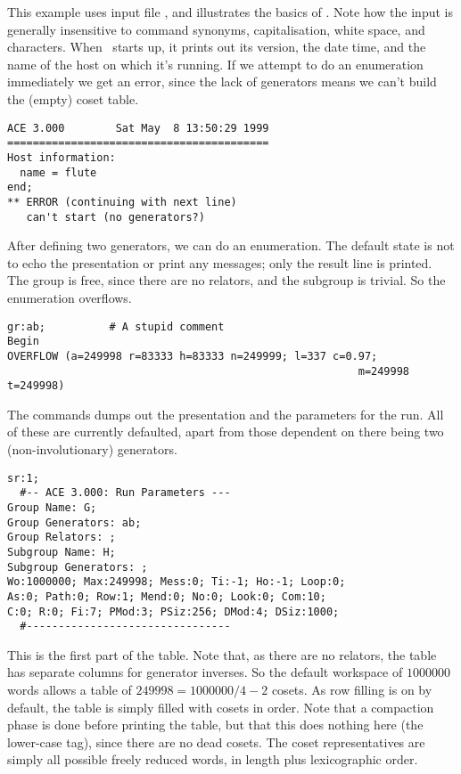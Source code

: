 
This example uses input file , and illustrates the basics of
  \ace.
Note how the input is generally insensitive to command synonyms,
  capitalisation, white space, and \ttt{:} \amp \ttt{;} characters.
%
When \ace\ starts up, it prints out its version, the date \amp time, and
  the name of the host on which it's running.
If we attempt to do an enumeration immediately we get an error, since the
  lack of generators means we can't build the (empty) coset table.

\bv\begin{verbatim}
ACE 3.000        Sat May  8 13:50:29 1999
=========================================
Host information:
  name = flute
end;
** ERROR (continuing with next line)
   can't start (no generators?)
\end{verbatim}\ev

After defining two generators, we can do an enumeration.
The default state is not to echo the presentation or print any messages;
  only the result line is printed.
The group is free, since there are no relators, and the subgroup is
 trivial.
So the enumeration overflows.

\bv\begin{verbatim}
gr:ab;          # A stupid comment
Begin
OVERFLOW (a=249998 r=83333 h=83333 n=249999; l=337 c=0.97; 
                                                       m=249998 t=249998)
\end{verbatim}\ev

The  commands dumps out the presentation and the parameters for
  the run.
All of these are currently defaulted, apart from those dependent on there
  being two (non-involutionary) generators.

\bv\begin{verbatim}
sr:1;
  #-- ACE 3.000: Run Parameters ---
Group Name: G;
Group Generators: ab;
Group Relators: ;
Subgroup Name: H;
Subgroup Generators: ;
Wo:1000000; Max:249998; Mess:0; Ti:-1; Ho:-1; Loop:0;
As:0; Path:0; Row:1; Mend:0; No:0; Look:0; Com:10;
C:0; R:0; Fi:7; PMod:3; PSiz:256; DMod:4; DSiz:1000;
  #--------------------------------
\end{verbatim}\ev

This is the first part of the table.
Note that, as there are no relators, the table has separate columns for
  generator inverses.
So the default workspace of $1000000$ words allows
  a table of $249998 = 1000000/4 - 2$ cosets.
As row filling is on by default, the table is simply filled with
  cosets in order.
Note that a compaction phase is done before printing the table, but that
  this does nothing here (the lower-case  tag), since there are no 
 dead cosets.
The coset representatives are simply all possible freely reduced words, in
  length plus lexicographic order.

